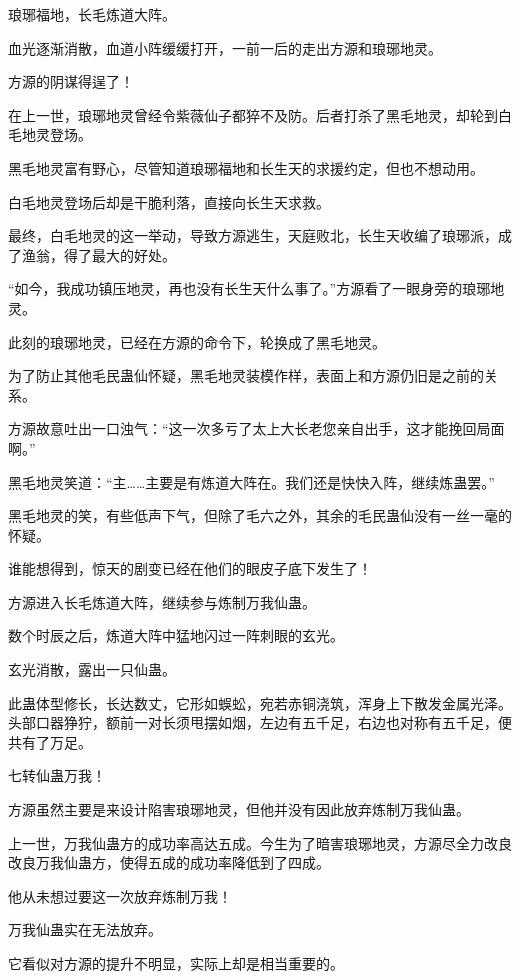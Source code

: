 
\begin{this_body}

琅琊福地，长毛炼道大阵。

血光逐渐消散，血道小阵缓缓打开，一前一后的走出方源和琅琊地灵。

方源的阴谋得逞了！

在上一世，琅琊地灵曾经令紫薇仙子都猝不及防。后者打杀了黑毛地灵，却轮到白毛地灵登场。

黑毛地灵富有野心，尽管知道琅琊福地和长生天的求援约定，但也不想动用。

白毛地灵登场后却是干脆利落，直接向长生天求救。

最终，白毛地灵的这一举动，导致方源逃生，天庭败北，长生天收编了琅琊派，成了渔翁，得了最大的好处。

“如今，我成功镇压地灵，再也没有长生天什么事了。”方源看了一眼身旁的琅琊地灵。

此刻的琅琊地灵，已经在方源的命令下，轮换成了黑毛地灵。

为了防止其他毛民蛊仙怀疑，黑毛地灵装模作样，表面上和方源仍旧是之前的关系。

方源故意吐出一口浊气：“这一次多亏了太上大长老您亲自出手，这才能挽回局面啊。”

黑毛地灵笑道：“主……主要是有炼道大阵在。我们还是快快入阵，继续炼蛊罢。”

黑毛地灵的笑，有些低声下气，但除了毛六之外，其余的毛民蛊仙没有一丝一毫的怀疑。

谁能想得到，惊天的剧变已经在他们的眼皮子底下发生了！

方源进入长毛炼道大阵，继续参与炼制万我仙蛊。

数个时辰之后，炼道大阵中猛地闪过一阵刺眼的玄光。

玄光消散，露出一只仙蛊。

此蛊体型修长，长达数丈，它形如蜈蚣，宛若赤铜浇筑，浑身上下散发金属光泽。头部口器狰狞，额前一对长须甩摆如烟，左边有五千足，右边也对称有五千足，便共有了万足。

七转仙蛊万我！

方源虽然主要是来设计陷害琅琊地灵，但他并没有因此放弃炼制万我仙蛊。

上一世，万我仙蛊方的成功率高达五成。今生为了暗害琅琊地灵，方源尽全力改良改良万我仙蛊方，使得五成的成功率降低到了四成。

他从未想过要这一次放弃炼制万我！

万我仙蛊实在无法放弃。

它看似对方源的提升不明显，实际上却是相当重要的。


\end{this_body}

